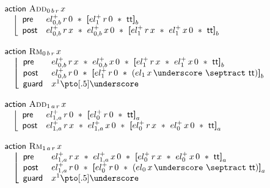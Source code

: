 \documentclass[12pt,a4paper]{article}
\renewcommand{\true}{\mathsf{tt}}
\renewcommand{\boxed}[2][]{{\textbf{[}}#2{\textbf{]}}_{#1}}
\begin{document}
\[
\begin{array}{l}
{\sf action} \Add 0br\,x \\
\quad\left\lfloor\begin{array}{ll}
{\sf pre} & \elhat 0b^+\,r\,0  * \boxed[b]{el_1^+\,r\,0  * \true} \\
{\sf post} & \elhat 0b^+\,r\,x  *  \elhat 0b^+\,x\,0  *  \boxed[b]{el_1^+\,r\,x  *  el_1^+\,x\,0  *  \true}
\end{array}\right. \\ \\
{\sf action} \Rm 0br\,x \\
\quad\left\lfloor\begin{array}{ll}
{\sf pre} & \elhat 0b^+\,r\,x  *  \elhat 0b^+\,x\,0  *  \boxed[b]{el_1^+\,r\,x  *  el_1^+\,x\,0  *  \true} \\
{\sf post} & \elhat 0b^+\,r\,0  * \boxed[b]{el_1^+\,r\,0  * (el_1\,x\,\underscore  \septract  \true)} \\
{\sf guard} & x^1\pto[.5]\underscore
\end{array}\right.\\ \\
{\sf action}  \Add 1ar\,x \\
\quad\left\lfloor\begin{array}{ll} 
{\sf pre} & \elhat 1a^+\,r\,0  * \boxed[a]{el_0^+\,r\,0  * \true} \\
{\sf post} & \elhat 1a^+\,r\,x  *  \elhat 1a^+\,x\,0  *  \boxed[a]{el_0^+\,r\,x  *  el_0^+\,x\,0  *  \true}
\end{array}\right. \\ \\
{\sf action} \Rm 1ar\,x \\
\quad\left\lfloor\begin{array}{ll}
{\sf pre} & \elhat 1a^+\,r\,x  *  \elhat 1a^+\,x\,0  *  \boxed[a]{el_0^+\,r\,x  *  el_0^+\,x\,0  *  \true} \\
{\sf post} & \elhat 1a^+\,r\,0  * \boxed[a]{el_0^+\,r\,0  * (el_0\,x\,\underscore  \septract  \true)} \\
{\sf guard} & x^1\pto[.5]\underscore
\end{array}\right.
\end{array}
\]
\end{document}

